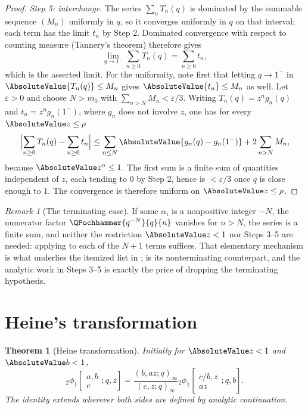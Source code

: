 \documentclass[11pt,a4paper,oneside,openany]{book}
\newtheorem{theorem}{Theorem}[chapter]
\theoremstyle{definition}
\theoremstyle{remark}
\newtheorem{remark}[remark]{Remark}
\newcommand{\eps}{\varepsilon}
\begin{document}
\begin{proof}
\emph{Step 5: interchange.}
The series $\sum_nT_n(q)$ is dominated by the summable sequence $(M_n)$ uniformly in $q$, so it converges uniformly in $q$ on that interval; each term has the limit $t_n$ by Step 2.  Dominated convergence with respect to counting measure (Tannery's theorem) therefore gives
\[
 \lim_{q\to1^-}\sum_{n\ge0}T_n(q)=\sum_{n\ge0}t_n,
\]
which is the asserted limit.  %
For the uniformity, note first that letting $q\to1^-$ in
$\AbsoluteValue{T_n(q)}\le M_n$ gives $\AbsoluteValue{t_n}\le M_n$ as well.  Let $\eps>0$ and
choose $N>m_0$ with $\sum_{n>N}M_n<\eps/3$.  Writing $T_n(q)=z^ng_n(q)$ and
$t_n=z^ng_n(1^-)$, where $g_n$ does not involve $z$, one has for every
$\AbsoluteValue z\le\rho$
\[
 \Bigl\lvert\sum_{n\ge0}T_n(q)-\sum_{n\ge0}t_n\Bigr\rvert
 \le\sum_{n\le N}\AbsoluteValue{g_n(q)-g_n(1^-)}+2\sum_{n>N}M_n,
\]
because $\AbsoluteValue z^n\le1$.  The first sum is a finite sum of quantities
independent of $z$, each tending to $0$ by Step 2, hence is $<\eps/3$ once
$q$ is close enough to $1$.  The convergence is therefore uniform on
$\AbsoluteValue z\le\rho$.
\end{proof}

\begin{remark}[The terminating case]\label{rem:classical-limit-terminating}
If some $\alpha_i$ is a nonpositive integer $-N$, the numerator factor $\QPochhammer{q^{-N}}{q}{n}$ vanishes for $n>N$, the series is a finite sum, and neither the restriction $\AbsoluteValue z<1$ nor Steps 3--5 are needed: applying  to each of the $N+1$ terms suffices.  That elementary mechanism is what underlies the itemized list in ;  is its nonterminating counterpart, and the analytic work in Steps 3--5 is exactly the price of dropping the terminating hypothesis.
\end{remark}

\section{Heine's transformation}

\begin{theorem}[Heine transformation]\label{thm:heine}
Initially for $\AbsoluteValue z<1$ and $\AbsoluteValue b<1$,
\[
 {}_2\phi_1\!\left[\begin{matrix}a,b\\c\end{matrix};q,z\right]
 =\frac{(b,az;q)_\infty}{(c,z;q)_\infty}
 {}_2\phi_1\!\left[\begin{matrix}c/b,z\\az\end{matrix};q,b\right].
\]
The identity extends wherever both sides are defined by analytic continuation.
\end{theorem}
\end{document}
